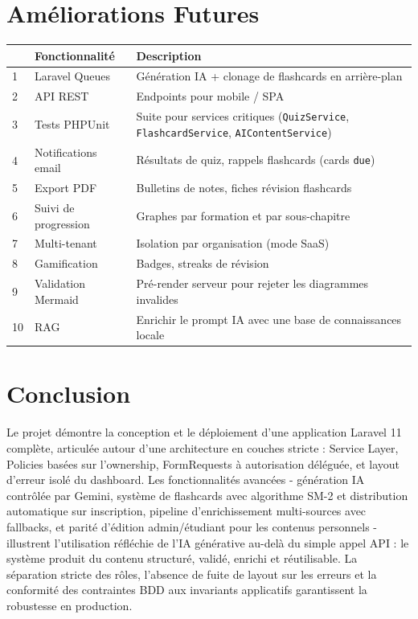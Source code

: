 \documentclass[10pt,a4paper]{article}
\begin{document}
\section{Am\'eliorations Futures}

\begin{infobox}
\begin{table}[H]
\renewcommand{\arraystretch}{1.3}
\begin{tabularx}{\textwidth}{p{0.5cm} p{3.8cm} X}
\toprule & \textbf{Fonctionnalit\'e} & \textbf{Description} \\ \midrule
1 & Laravel Queues & G\'en\'eration IA + clonage de flashcards en arri\`ere-plan \\
2 & API REST & Endpoints pour mobile / SPA \\
3 & Tests PHPUnit & Suite pour services critiques (\texttt{QuizService}, \texttt{FlashcardService}, \texttt{AIContentService}) \\
4 & Notifications email & R\'esultats de quiz, rappels flashcards (cards \texttt{due}) \\
5 & Export PDF & Bulletins de notes, fiches r\'evision flashcards \\
6 & Suivi de progression & Graphes par formation et par sous-chapitre \\
7 & Multi-tenant & Isolation par organisation (mode SaaS) \\
8 & Gamification & Badges, streaks de r\'evision \\
9 & Validation Mermaid & Pr\'e-render serveur pour rejeter les diagrammes invalides \\
10 & RAG & Enrichir le prompt IA avec une base de connaissances locale \\
\bottomrule
\end{tabularx}
\end{table}
\end{infobox}

\section*{Conclusion}

Le projet d\'emontre la conception et le d\'eploiement d'une application Laravel 11 compl\`ete, articul\'ee autour d'une architecture en couches stricte : Service Layer, Policies bas\'ees sur l'ownership, FormRequests \`a autorisation d\'el\'egu\'ee, et layout d'erreur isol\'e du dashboard. Les fonctionnalit\'es avanc\'ees - g\'en\'eration IA contr\^ol\'ee par Gemini, syst\`eme de flashcards avec algorithme SM-2 et distribution automatique sur inscription, pipeline d'enrichissement multi-sources avec fallbacks, et parit\'e d'\'edition admin/\'etudiant pour les contenus personnels - illustrent l'utilisation r\'efl\'echie de l'IA g\'en\'erative au-del\`a du simple appel API : le syst\`eme produit du contenu structur\'e, valid\'e, enrichi et r\'eutilisable. La s\'eparation stricte des r\^oles, l'absence de fuite de layout sur les erreurs et la conformit\'e des contraintes BDD aux invariants applicatifs garantissent la robustesse en production.
\end{document}
